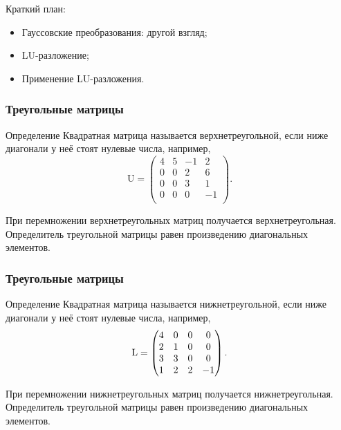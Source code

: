 
\begin{frame} %


\end{frame}



\begin{frame}{Краткий план:}
  \begin{itemize}[<+->]
    \item Гауссовские преобразования: другой взгляд;
    \item LU-разложение;
    \item Применение LU-разложения.
  \end{itemize}

\end{frame}



\begin{frame}
    \frametitle{Треугольные матрицы}

    \begin{block}{Определение}
        Квадратная матрица называется \alert{верхнетреугольной},
        если ниже диагонали у неё стоят нулевые числа, например,
        \[
            \mathrm{U} = 
        \begin{pmatrix}
            4 & 5 & -1 & 2 \\
            0 & 0 & 2 & 6 \\
            0 & 0 & 3 & 1 \\
            0 & 0 & 0 & -1 \\
        \end{pmatrix}.    
        \]
    \end{block}
\pause
При перемножении верхнетреугольных матриц получается верхнетреугольная.
\pause
Определитель треугольной матрицы равен произведению диагональных элементов.

\end{frame}


\begin{frame}
\frametitle{Треугольные матрицы}

    \begin{block}{Определение}
        Квадратная матрица называется \alert{нижнетреугольной},
        если ниже диагонали у неё стоят нулевые числа, например,
        \[
            \operatorname{L} =
        \begin{pmatrix}
            4 & 0 & 0 & 0 \\
            2 & 1 & 0 & 0 \\
            3 & 3 & 0 & 0 \\
            1 & 2 & 2 & -1 \\
        \end{pmatrix}.    
        \]
    \end{block}
    \pause
    При перемножении нижнетреугольных матриц получается нижнетреугольная.
    \pause
    Определитель треугольной матрицы равен произведению диагональных элементов.

\end{frame}




